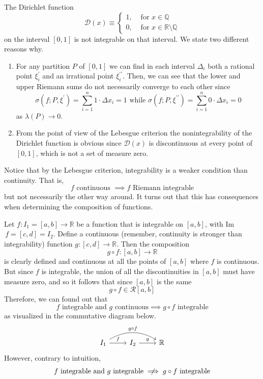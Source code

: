     \begin{example}
    The Dirichlet function
    \[\mathcal{D}(x) \equiv \begin{cases}
    1, & \text{ for } x \in \mathbb{Q} \\
    0, & \text{ for } x \in \mathbb{R} \setminus \mathbb{Q}
    \end{cases}\]
    on the interval $[0,1]$ is not integrable on that interval. We state two different reasons why. 
    \begin{enumerate}
      \item For any partition $P$ of $[0,1]$ we can find in each interval $\Delta_i$ both a rational point $\xi^\prime_i$ and an irrational point $\xi_i^{\prime\prime}$. Then, we can see that the lower and upper Riemann sums do not necessarily converge to each other since
      \[\sigma(f; P, \xi^\prime) = \sum_{i=1}^n 1 \cdot \Delta x_i = 1 \text{ while } \sigma(f;P, \xi^{\prime\prime}) = \sum_{i=1}^n 0 \cdot \Delta x_i = 0\]
      as $\lambda(P) \rightarrow 0$. 
      \item From the point of view of the Lebesgue criterion the nonintegrability of the Dirichlet function is obvious since $\mathcal{D}(x)$ is discontinuous at every point of $[0, 1]$, which is not a set of measure zero. 
    \end{enumerate}
    \end{example}

    Notice that by the Lebesgue criterion, integrability is a weaker condition than continuity. That is, 
    \[f \text{ continuous } \implies f \text{ Riemann integrable}\]
    but not necessarily the other way around. It turns out that this has consequences when determining the composition of functions. 

    \begin{proposition}
    Let $f: I_1 = [a, b] \longrightarrow\mathbb{R}$ be a function that is integrable on $[a, b]$, with Im$\,f = [c, d] = I_2$. Define a continuous (remember, continuity is stronger than integrability) function $g: [c, d] \longrightarrow \mathbb{R}$. Then the composition
    \[g \circ f: [a, b] \longrightarrow \mathbb{R}\]
    is clearly defined and continuous at all the points of $[a, b]$ where $f$ is continuous. But since $f$ is integrable, the union of all the discontinuities in $[a, b]$ must have measure zero, and so it follows that since $[a, b]$ is the same  
    \[g \circ f \in \mathcal{R}[a, b]\]
    Therefore, we can found out that 
    \[f \text{ integrable and } g \text{ continuous} \implies g \circ f \text{ integrable}\]
    as visualized in the commutative diagram below. 
    \[
      \begin{tikzcd}
        I_1 \arrow[r, "f"] \arrow[rr, bend left, "g \circ f"] & I_2 \arrow[r, "g"] & \mathbb{R}
      \end{tikzcd}
    \]
    However, contrary to intuition, 
    \[f \text{ integrable and } g \text{ integrable} \centernot\implies g \circ f \text{ integrable}\]
    \end{proposition}

